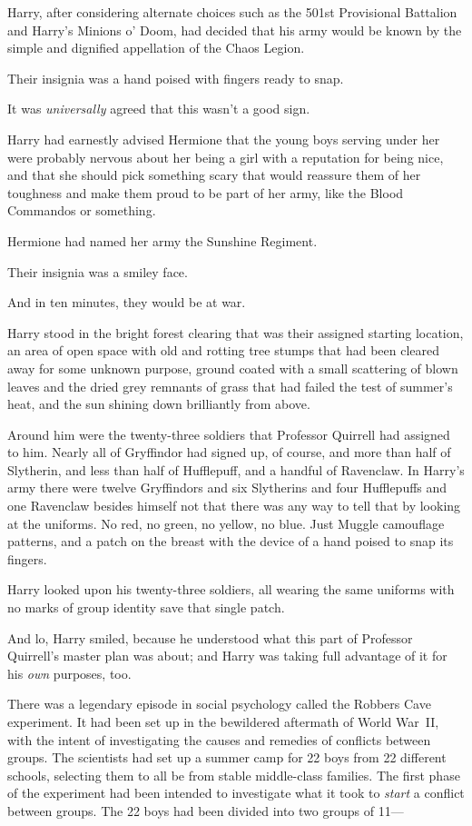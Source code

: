 Harry, after considering alternate choices such as the 501st Provisional
Battalion and Harry's Minions o' Doom, had decided that his army would be known
by the simple and dignified appellation of the Chaos Legion.

Their insignia was a hand poised with fingers ready to snap.

It was \emph{universally} agreed that this wasn't a good sign.

Harry had earnestly advised Hermione that the young boys serving under her were
probably nervous about her being a girl with a reputation for being nice, and
that she should pick something scary that would reassure them of her toughness
and make them proud to be part of her army, like the Blood Commandos or
something.

Hermione had named her army the Sunshine Regiment.

Their insignia was a smiley face.

And in ten minutes, they would be at war.

Harry stood in the bright forest clearing that was their assigned starting
location, an area of open space with old and rotting tree stumps that had been
cleared away for some unknown purpose, ground coated with a small scattering of
blown leaves and the dried grey remnants of grass that had failed the test of
summer's heat, and the sun shining down brilliantly from above.

Around him were the twenty-three soldiers that Professor Quirrell had assigned
to him. Nearly all of Gryffindor had signed up, of course, and more than half
of Slytherin, and less than half of Hufflepuff, and a handful of Ravenclaw. In
Harry's army there were twelve Gryffindors and six Slytherins and four
Hufflepuffs and one Ravenclaw besides himself{\el} not that there was any
way to tell that by looking at the uniforms. No red, no green, no yellow, no
blue. Just Muggle camouflage patterns, and a patch on the breast with the
device of a hand poised to snap its fingers.

Harry looked upon his twenty-three soldiers, all wearing the same uniforms with
no marks of group identity save that single patch.

And lo, Harry smiled, because he understood what this part of Professor
Quirrell's master plan was about; and Harry was taking full advantage of it for
his \emph{own} purposes, too.

There was a legendary episode in social psychology called the Robbers Cave
experiment. It had been set up in the bewildered aftermath of World War~II,
with the intent of investigating the causes and remedies of conflicts between
groups. The scientists had set up a summer camp for 22 boys from 22 different
schools, selecting them to all be from stable middle-class families. The first
phase of the experiment had been intended to investigate what it took to
\emph{start} a conflict between groups. The 22 boys had been divided into two
groups of 11\mbox{---}

